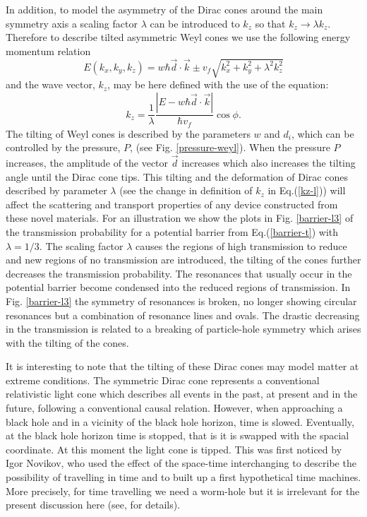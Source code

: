 \documentclass[prb,twocolumn,aps,superscriptaddress,showpacs,floatfix]{revtex4}
\begin{document}
	In addition, to model the asymmetry of the Dirac cones around the main symmetry axis a scaling factor $\lambda$ can be introduced to $k_{z}$ so that $k_{z} \rightarrow \lambda k_{z}$. Therefore to describe tilted asymmetric Weyl cones we use the following energy momentum relation
		\begin{equation}
			E(k_x,k_y,k_z)=w \hbar \vec{d}\cdot \vec{ k}\pm v_{f}\sqrt{k_{x}^{2}+k_{y}^{2}+\lambda^{2} k_{z}^{2}}
			\label{energy-momentum-l}
		\end{equation}
		and the wave vector, $k_{z}$, may be here defined with the use of the equation:
		\begin{equation}
			k_{z}=\frac{1}{\lambda}\frac{|E-w \hbar \vec{d}\cdot \vec{ k} |}{\hbar v_{f}}\cos\phi.
			\label{kz-l}
		\end{equation}
	The tilting of Weyl cones is described by the parameters $w$ and $d_i$, which can be controlled by the pressure, $P$, (see Fig. \ref{pressure-weyl}). When the pressure $P$ increases, the amplitude of the vector $ \vec{d}$ increases which also increases the tilting angle until the Dirac cone tips. This tilting and the deformation  of Dirac cones described by parameter $\lambda$ (see the change in definition of $k_{z}$ in Eq.(\ref{kz-l})) will affect the scattering and transport properties of any device constructed from these novel materials. For an illustration we show the plots in Fig. \ref{barrier-l3} of the transmission probability for a potential barrier from Eq.(\ref{barrier-t}) with $\lambda=1/3$. The scaling factor $\lambda$ causes the regions of high transmission to reduce and new regions of no transmission are introduced, the tilting of the cones further decreases the transmission probability. The resonances that usually occur in the potential barrier become condensed into the reduced regions of transmission. In Fig. \ref{barrier-l3} the symmetry of resonances is broken, no longer showing circular resonances but a combination of resonance lines and ovals. The drastic decreasing in the transmission is related to a breaking of particle-hole symmetry which arises with the tilting of the cones.

	It is interesting to note that the tilting of these Dirac cones may model matter at extreme conditions. The symmetric Dirac cone represents a conventional relativistic light cone which describes all events in the past, at present and in the future, following a conventional causal relation. However, when approaching a black hole and in a vicinity of the black hole horizon, time is slowed. Eventually, at the black hole horizon time is stopped, that is it is swapped with the spacial coordinate. At this moment the light cone is tipped. This was first noticed by Igor Novikov\cite{Novikov-1963,Novikov-1989,Novikov-1989a}, who used the effect of the space-time interchanging to describe the possibility of travelling in time and to built up a first hypothetical time machines. More precisely, for time travelling we need a worm-hole but it is irrelevant for the present discussion here (see, for details\cite{Novikov-1990}).
\end{document}
